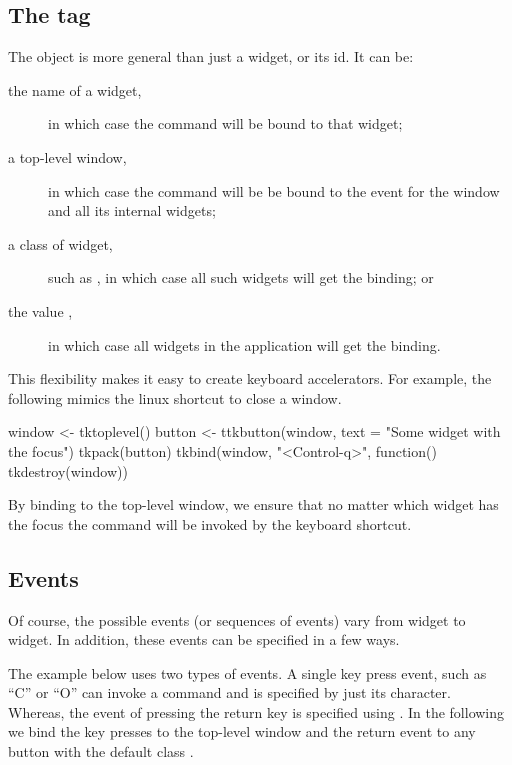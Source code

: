 
\subsection{The tag}

The  object is more general than just a widget, or its
id. It can be:

\begin{description}
\item[the name of a widget,] in which case the command will be bound to that widget;
\item[a top-level window,] in which case the command will be be bound
  to the event for the window and all its internal widgets;
\item[a class of widget,] such as , in which case all
  such widgets will get the binding; or
\item[the value ,] in which case all widgets in the
  application will get the binding.
\end{description}

This flexibility makes it easy to create keyboard accelerators. For
example, the following mimics the linux shortcut  to
close a window.
\begin{Schunk}
\begin{Sinput}
 window <- tktoplevel()
 button <- ttkbutton(window, text = "Some widget with the focus")
 tkpack(button)
 tkbind(window, "<Control-q>", function() tkdestroy(window))
\end{Sinput}
\end{Schunk}
%
By binding to the top-level window, we ensure that no matter which
widget has the focus the command will be invoked by the keyboard shortcut.


\subsection{Events}
\label{sec:tcltk:events}

Of course, the possible events (or sequences of events) vary from widget to
widget. In addition, these events can be specified in a few ways. 

The example below uses two types of events. A single key press event, such as
``C'' or ``O'' can invoke a command and is specified by just its
character. Whereas, the event of pressing the return key is specified
using . In the following we bind the key presses to the
top-level window and the return event to any button with the default
class .

